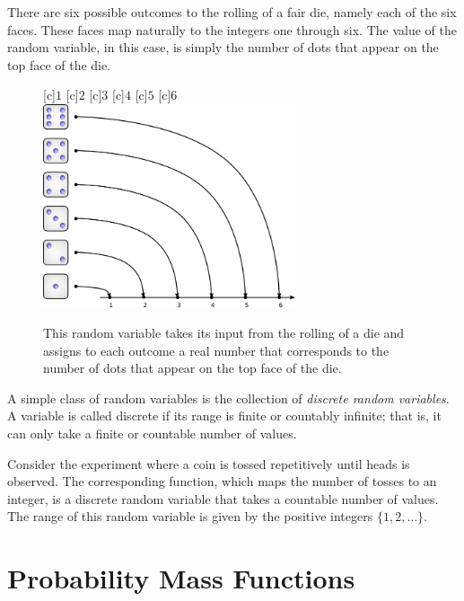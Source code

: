 \begin{example}
There are six possible outcomes to the rolling of a fair die, namely each of the six faces.
These faces map naturally to the integers one through six.
The value of the random variable, in this case, is simply the number of dots that appear on the top face of the die.

\begin{figure}[ht]
\begin{center}
\begin{psfrags}
[c]{$1$}
[c]{$2$}
[c]{$3$}
[c]{$4$}
[c]{$5$}
[c]{$6$}
\includegraphics[height=5.99cm]{Figures/5Chapter/rvdices}
\caption{This random variable takes its input from the rolling of a die and assigns to each outcome a real number that corresponds to the number of dots that appear on the top face of the die.}
\end{psfrags}
\end{center}
\end{figure}
\end{example}

A simple class of random variables is the collection of \emph{discrete random variables}. 
A variable is called discrete if its range is finite or countably infinite; that is, it can only take a finite or countable number of values.

\begin{example}
Consider the experiment where a coin is tossed repetitively until heads is observed.
The corresponding function, which maps the number of tosses to an integer, is a discrete random variable that takes a countable number of values.
The range of this random variable is given by the positive integers $\{1, 2, \ldots \}$.
\end{example}

\section{Probability Mass Functions}

